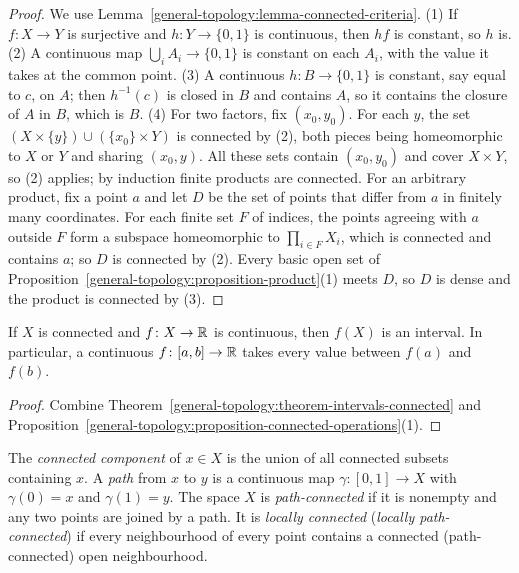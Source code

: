 \begin{proof}
We use Lemma~\ref{general-topology:lemma-connected-criteria}. (1) If $f \colon X \to Y$ is surjective and $h \colon Y \to \{0,1\}$ is continuous, then
$hf$ is constant, so $h$ is. (2) A continuous map $\bigcup_i A_i \to \{0, 1\}$ is constant on each $A_i$, with the value it takes at the common point.
(3) A continuous $h \colon B \to \{0,1\}$ is constant, say equal to $c$, on $A$; then $h^{-1}(c)$ is closed in $B$ and contains $A$, so it contains the
closure of $A$ in $B$, which is $B$. (4) For two factors, fix $(x_0, y_0)$. For each $y$, the set $(X \times \{y\}) \cup (\{x_0\} \times Y)$ is connected by
(2), both pieces being homeomorphic to $X$ or $Y$ and sharing $(x_0, y)$. All these sets contain $(x_0, y_0)$ and cover $X \times Y$, so (2) applies; by
induction finite products are connected. For an arbitrary product, fix a point $a$ and let $D$ be the set of points that differ from $a$ in finitely
many coordinates. For each finite set $F$ of indices, the points agreeing with $a$ outside $F$ form a subspace homeomorphic to $\prod_{i \in F} X_i$,
which is connected and contains $a$; so $D$ is connected by (2). Every basic open set of
Proposition~\ref{general-topology:proposition-product}(1) meets $D$, so $D$ is dense and the product is connected by (3).
\end{proof}

\begin{corollary}\label{general-topology:corollary-ivt}
If $X$ is connected and $f \colon X \to \mathbb{R}$ is continuous, then $f(X)$ is an interval. In particular, a continuous $f \colon [a, b] \to \mathbb{R}$ takes every
value between $f(a)$ and $f(b)$.
\end{corollary}

\begin{proof}
Combine Theorem~\ref{general-topology:theorem-intervals-connected} and Proposition~\ref{general-topology:proposition-connected-operations}(1).
\end{proof}

\begin{definition}\label{general-topology:definition-components}
The \emph{connected component} of $x \in X$ is the union of all connected subsets containing $x$. A \emph{path} from $x$ to $y$ is a continuous map
$\gamma \colon [0, 1] \to X$ with $\gamma(0) = x$ and $\gamma(1) = y$. The space $X$ is \emph{path-connected} if it is nonempty and any two points are
joined by a path. It is \emph{locally connected} (\emph{locally path-connected}) if every neighbourhood of every point contains a connected
(path-connected) open neighbourhood.
\end{definition}

